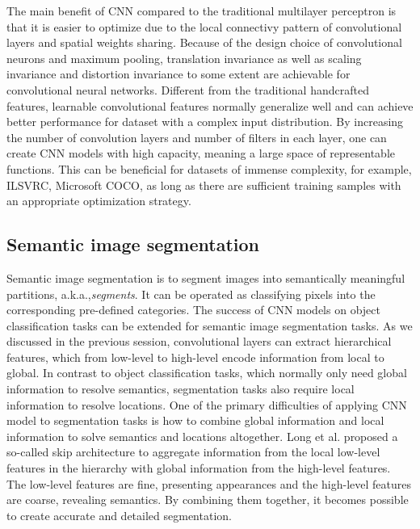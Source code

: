 
The main benefit of CNN compared to the traditional multilayer perceptron is that it is easier to optimize due to the local connectivy pattern of convolutional layers and spatial weights sharing.
Because of the design choice of convolutional neurons and maximum pooling, translation invariance as well as scaling invariance and distortion invariance to some extent are achievable for convolutional neural networks.\cite{lecun1998gradient}
Different from the traditional handcrafted features, learnable convolutional features normally generalize well and can achieve better performance for dataset with a complex input distribution.\cite{krizhevsky2012imagenet}
By increasing the number of convolution layers and number of filters in each layer, one can create CNN models with high capacity, meaning a large space of representable functions.
This can be beneficial for datasets of immense complexity, for example, ILSVRC\cite{russakovsky2015imagenet}, Microsoft COCO\cite{lin2014microsoft}, as long as there are sufficient training samples with an appropriate optimization strategy.


\subsection{Semantic image segmentation}

Semantic image segmentation is to segment images into semantically meaningful partitions, a.k.a.,\textit{segments}.
It can be operated as classifying pixels into the corresponding pre-defined categories.
The success of CNN models on object classification tasks can be extended for semantic image segmentation tasks.\cite{long2015fully}
As we discussed in the previous session, convolutional layers can extract hierarchical features, which from low-level to high-level encode information from local to global.
In contrast to object classification tasks, which normally only need global information to resolve semantics, segmentation tasks also require local information to resolve locations.
One of the primary difficulties of applying CNN model to segmentation tasks is how to combine global information and local information to solve semantics and locations altogether.
Long et al.\cite{long2015fully} proposed a so-called skip architecture to aggregate information from the local low-level features in the hierarchy with global information from the high-level features.
The low-level features are fine, presenting appearances and the high-level features are coarse, revealing semantics.
By combining them together, it becomes possible to create accurate and detailed segmentation.

